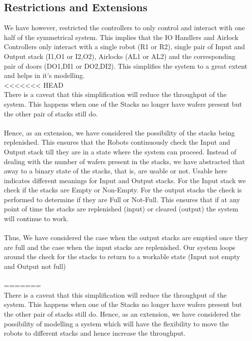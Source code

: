 \documentclass[a4paper,12pt]{article}
\begin{document}
	\subsection{Restrictions and Extensions}
	We have however, restricted the controllers to only control and interact with one half of the symmetrical system. This implies that the IO Handlers and Airlock Controllers only interact with a single robot (R1 or R2), single pair of Input and Output stack (I1,O1 or I2,O2), Airlocks (AL1 or AL2) and the corresponding pair of doors (DO1,DI1 or DO2,DI2). This simplifies the system to a great extent and helps in it's modelling.
	\\
<<<<<<< HEAD
	\\There is a caveat that this simplification will reduce the throughput of the system. This happens when one of the Stacks no longer have wafers present but the other pair of stacks still do. 
	\\
	\\Hence, as an extension, we have considered the possibility of the stacks being replenished. This ensures that the Robots continuously check the Input and Output stack till they are in a state where the system can proceed. Instead of dealing with the number of wafers present in the stacks, we have abstracted that away to a binary state of the stacks, that is, are usable or not. Usable here indicates different meanings for Input and Output stacks. For the Input stack we check if the stacks are Empty or Non-Empty. For the output stacks the check is performed to determine if they are Full or Not-Full. This ensures that if at any point of time the stacks are replenished (input) or cleared (output) the system will continue to work. 
	\\
	\\Thus, We have considered the case when the output stacks are emptied once they are full and the case when the input stacks are replenished. Our system loops around the check for the stacks to return to a workable state (Input not empty and Output not full)
	\\
	\\
=======
	\\There is a caveat that this simplification will reduce the throughput of the system. This happens when one of the Stacks no longer have wafers present but the other pair of stacks still do. Hence, as an extension, we have considered the possibility of modelling a system which will have the flexibility to move the robots to different stacks and hence increase the throughput. 
\end{document}
